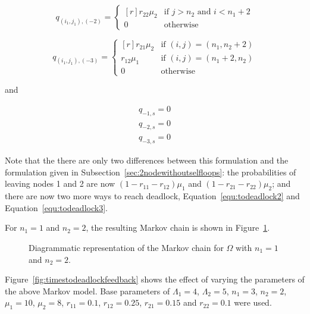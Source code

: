 \documentclass{article}
\begin{document}
\begin{equation}\label{equ:todeadlock3}
  q_{(i_1, j_1), (-2)} = \left\{
  \begin{matrix*}[ r ]
    r_{22}\mu_2 & \text{if } j > n_2 \text{ and } i < n_1 + 2 \\
    0 & \text{otherwise}
  \end{matrix*}
  \right.
\end{equation}

\begin{equation}
  q_{(i_1, j_1), (-3)} = \left\{
  \begin{matrix*}[ r ]
    r_{21}\mu_2 & \text{if } (i, j) = (n_1, n_2 + 2) \\
    r_{12}\mu_1 & \text{if } (i, j) = (n_1 + 2, n_2) \\
    0 & \text{otherwise}
  \end{matrix*}
  \right.
\end{equation}

and

\begin{align}
  q_{-1, s} = 0 \\
  q_{-2, s} = 0 \\
  q_{-3, s} = 0
\end{align}

Note that the there are only two differences between this formulation and the formulation given in Subsection~\ref{sec:2nodewithoutselfloops}: the probabilities of leaving nodes 1 and 2 are now $(1-r_{11}-r_{12})\mu_1$ and $(1-r_{21}-r_{22})\mu_2$; and there are now two more ways to reach deadlock, Equation~\ref{equ:todeadlock2} and Equation~\ref{equ:todeadlock3}.

For $n_1 = 1$ and $n_2 = 2$, the resulting Markov chain is shown in Figure~\ref{fig:2nodeMCfeedback}.

\begin{figure}[!htbp]
    
    \caption{Diagrammatic representation of the Markov chain for $\Omega$ with $n_1=1$ and $n_2=2$.}
    \label{fig:2nodeMCfeedback}
\end{figure}

Figure~\ref{fig:timestodeadlockfeedback} shows the effect of varying the parameters of the above Markov model.
Base parameters of $\Lambda_1 = 4$, $\Lambda_2 = 5$, $n_1 = 3$, $n_2 = 2$, $\mu_1 = 10$, $\mu_2 = 8$, $r_{11} = 0.1$, $r_{12} = 0.25$, $r_{21} = 0.15$ and $r_{22} = 0.1$ were used.
\end{document}
